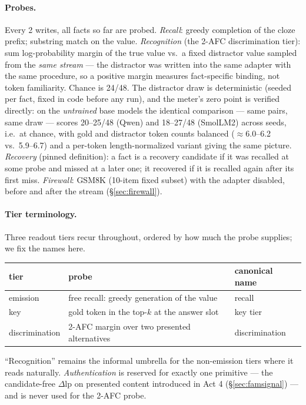 \documentclass[11pt]{article}
\newcommand{\dlp}{\Delta\mathrm{lp}}
\begin{document}
\paragraph{Probes.} Every 2 writes, all facts so far are probed. \emph{Recall}: greedy completion
of the cloze prefix; substring match on the value. \emph{Recognition} (the 2-AFC discrimination tier): sum log-probability margin
of the true value vs.\ a fixed distractor value sampled from the \emph{same stream} --- the
distractor was written into the same adapter with the same procedure, so a positive margin
measures fact-specific binding, not token familiarity. Chance is 24/48. The distractor draw is
deterministic (seeded per fact, fixed in code before any run), and the meter's zero point is
verified directly: on the \emph{untrained} base models the identical comparison --- same pairs,
same draw --- scores 20--25/48 (Qwen) and 18--27/48 (SmolLM2) across seeds, i.e.\ at chance, with
gold and distractor token counts balanced ($\approx$6.0--6.2 vs.\ 5.9--6.7) and a per-token
length-normalized variant giving the same picture. \emph{Recovery} (pinned
definition): a fact is a recovery candidate if it was recalled at some probe and missed at a
later one; it recovered if it is recalled again after its first miss. \emph{Firewall}: GSM8K
(10-item fixed subset) with the adapter disabled, before and after the stream
(\S\ref{sec:firewall}).

\paragraph{Tier terminology.} Three readout tiers recur throughout, ordered by how much the
probe supplies; we fix the names here.
\begin{center}\small
\begin{tabular}{lll}
\toprule
tier & probe & canonical name \\
\midrule
emission & free recall: greedy generation of the value & recall \\
key & gold token in the top-$k$ at the answer slot & key tier \\
discrimination & 2-AFC margin over two presented alternatives & discrimination \\
\bottomrule
\end{tabular}
\end{center}
``Recognition'' remains the informal umbrella for the non-emission tiers where it reads
naturally. \emph{Authentication} is reserved for exactly one primitive --- the candidate-free
$\dlp$ on presented content introduced in Act 4 (\S\ref{sec:famsignal}) --- and is never used
for the 2-AFC probe.
\end{document}
